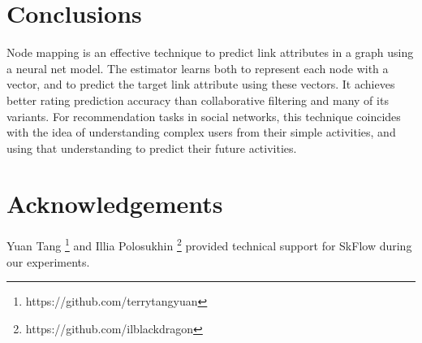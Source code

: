 \documentclass[twocolumn]{article}
\begin{document}
\section{Conclusions}
Node mapping is an effective technique to predict link attributes in a graph 
using a neural net model.
The estimator learns both to represent each node with a vector, and to predict 
the target link attribute using these vectors.
It achieves better rating prediction accuracy than collaborative filtering and 
many of its variants.
For recommendation tasks in social networks, this technique coincides with the 
idea of understanding complex users from their simple activities, and using 
that understanding to predict their future activities.

\section*{Acknowledgements}
Yuan Tang \footnote{https://github.com/terrytangyuan} and Illia Polosukhin 
\footnote{https://github.com/ilblackdragon} provided technical support for 
SkFlow during our experiments.



\end{document}

